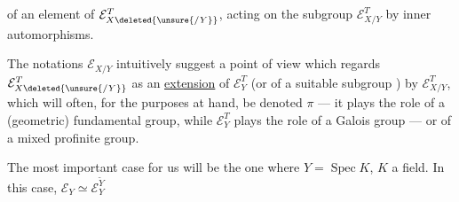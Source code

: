 
of an element of $\mathcal E_{X\deleted{\unsure{/Y}}}^T$, acting on the subgroup $\mathcal E_{X/Y}^T$ by inner automorphisms.

The notations  $\mathcal E_{X/Y}$ intuitively suggest a point of view which regards $\mathcal E_{X\deleted{\unsure{/Y}}}^T$ as an \uline{extension} of $\mathcal E_Y^T$ (or of a suitable subgroup ) by $\mathcal E_{X/Y}^T$, which will often, for the purposes at hand, be denoted $\pi$ --- it plays the role of a (geometric) fundamental group, while $\mathcal E_Y^T$ plays the role of a Galois group --- or of a mixed profinite group.


The most important case for us will be the one where $Y=\operatorname{Spec}K$, $K$ a field.  In this case, $\mathcal E_Y\simeq\mathcal E_Y^{\widetilde Y}$

